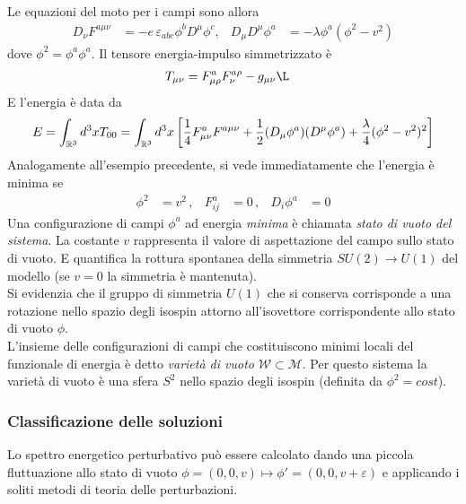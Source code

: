 Le equazioni del moto per i campi sono allora
\begin{equation}\label{eq:nabeqmotion}
   \begin{aligned}
      D_\nu F ^{a\mu\nu} & = -e \, \varepsilon_{abc} \phi^b D^\mu \phi^c, &
      D_\mu D^\mu \phi^a & = - \lambda \phi^a (\phi^2 - v^2 )
   \end{aligned}
\end{equation}
dove $\phi^2 = \phi^a\phi^a$. Il tensore energia-impulso simmetrizzato è
\begin{equation}
   \begin{aligned}
      T_{\mu\nu} & =
         F^a _{\mu\rho}F^{a\rho}_\nu - g_{\mu\nu} \L
   \end{aligned}
\end{equation}
E l'energia è data da
\begin{equation}
   E = \int_{\mathbb{R}^3} d^3x T_{00}
     = \int_{\mathbb{R}^3} d^3x \left[ \frac{1}{4} F^a_{\mu\nu}F^{a\mu\nu}
        + \frac{1}{2} (D_\mu \phi^a) (D^\mu \phi^a)
        + \frac{\lambda}{4}(\phi^2 - v^2)^2 \right]
\end{equation}
Analogamente all'esempio precedente, si vede immediatamente che l'energia è minima se
\begin{equation}
   \begin{aligned}
      \phi^2 & = v^2 \, , &
      F^a_{ij} & = 0 \, , &
      D_i \phi^a & = 0
   \end{aligned}
\end{equation}
Una configurazione di campi $\phi^a$ ad energia \emph{minima} è chiamata
\emph{stato di vuoto del sistema}. La costante $v$ rappresenta il valore di
aspettazione del campo sullo stato di vuoto. E quantifica la rottura spontanea
della simmetria $SU(2) \to U(1)$ del modello (se $v=0$ la simmetria è mantenuta).\\
Si evidenzia che il gruppo di simmetria $U(1)$ che si conserva corrisponde a
una rotazione nello spazio degli isospin attorno all'isovettore corrispondente
allo stato di vuoto $\phi$.\\

L'insieme delle configurazioni di campi che costituiscono minimi locali
del funzionale di energia è detto \emph{varietà di vuoto}
$\mathcal{W} \subset \mathcal{M}$. Per questo sistema la varietà di vuoto è una
sfera $S^2$ nello spazio degli isospin (definita da $\phi^2 = cost$).\\
\subsubsection{Classificazione delle soluzioni}
Lo spettro energetico perturbativo può essere calcolato dando una piccola fluttuazione
allo stato di vuoto $\phi = (0,0,v) \mapsto \phi' = (0,0,v + \varepsilon)$ e applicando
i soliti metodi di teoria delle perturbazioni.\\

